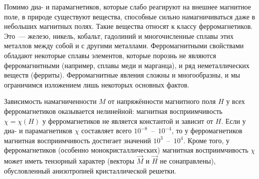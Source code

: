 \label{sec:ferromagnetism}

Помимо диа- и парамагнетиков, которые слабо реагируют на внешнее магнитное поле,
в природе существуют вещества, способные сильно намагничиваться даже в небольших
магнитных полях. Такие вещества относят к классу ферромагнетиков. Это~---
железо, никель, кобальт, гадолиний и многочисленные сплавы этих металлов между
собой и с другими металлами. Ферромагнитными свойствами обладают некоторые
сплавы элементов, которые порознь не являются ферромагнитными (например, сплавы
меди и марганца), и ряд неметаллических веществ (ферриты). Ферромагнитные явления
сложны и многообразны, и мы ограничимся изложением лишь некоторых основных фактов.

Зависимость намагниченности $M$ от напряжённости магнитного поля $H$ у всех
ферромагнетиков оказывается нелинейной: магнитная восприимчивость
$\chi=\chi(H)$ у ферромагнетиков не является константой и зависит от $H$.
Если у диа- и парамагнетиков $\chi$ составляет всего $10^{-8}$~--~$10^{-4}$, то у
ферромагнетиков магнитная восприимчивость достигает значений $10^3$~--~$10^4$.
Кроме того, у ферромагнетиков (особенно монокристаллических)
магнитная восприимчивость $\chi$ может иметь тензорный характер
(векторы $\vec{M}$ и $\vec{H}$ не сонаправлены),
обусловленный анизотропией кристаллической решетки.

%
%
%

